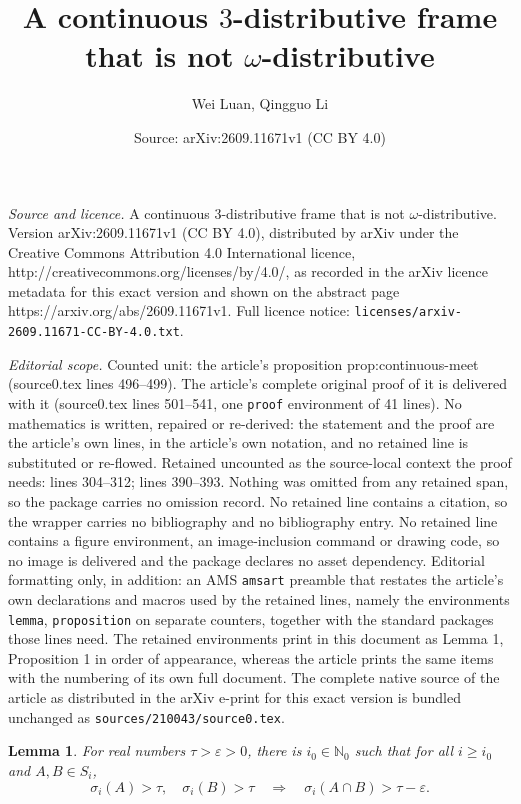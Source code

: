 \documentclass[10pt,a4paper]{amsart}
\title{A continuous $3$-distributive frame that is not $\omega$-distributive}
\author{Wei Luan, Qingguo Li}
\date{Source: arXiv:2609.11671v1 (CC BY 4.0)}
\newtheorem{lemma}{Lemma}
\newcommand{\NN}{\mathbb N}
\begin{document}
\maketitle

\noindent\emph{Source and licence.} A continuous $3$-distributive frame that is not $\omega$-distributive. Version arXiv:2609.11671v1 (CC BY 4.0), distributed by arXiv under the Creative Commons Attribution 4.0 International licence, http://creativecommons.org/licenses/by/4.0/, as recorded in the arXiv licence metadata for this exact version and shown on the abstract page https://arxiv.org/abs/2609.11671v1. Full licence notice: \texttt{licenses/arxiv-2609.11671-CC-BY-4.0.txt}.\par\smallskip

\noindent\textit{Editorial scope.} Counted unit: the article's proposition prop:continuous-meet (source0.tex lines 496--499). The article's complete original proof of it is delivered with it (source0.tex lines 501--541, one \texttt{proof} environment of 41 lines). No mathematics is written, repaired or re-derived: the statement and the proof are the article's own lines, in the article's own notation, and no retained line is substituted or re-flowed.  Retained uncounted as the source-local context the proof needs: lines 304--312; lines 390--393.  Nothing was omitted from any retained span, so the package carries no omission record.  No retained line contains a citation, so the wrapper carries no bibliography and no bibliography entry.  No retained line contains a figure environment, an image-inclusion command or drawing code, so no image is delivered and the package declares no asset dependency.  Editorial formatting only, in addition: an AMS \texttt{amsart} preamble that restates the article's own declarations and macros used by the retained lines, namely the environments \texttt{lemma}, \texttt{proposition} on separate counters, together with the standard packages those lines need.  The retained environments print in this document as Lemma 1, Proposition 1 in order of appearance, whereas the article prints the same items with the numbering of its own full document.  The complete native source of the article as distributed in the arXiv e-print for this exact version is bundled unchanged as \texttt{sources/210043/source0.tex}.
\begin{lemma}\label{lem:slow-intersection}
For real numbers $\tau>\varepsilon>0$, there is $i_0\in\NN_0$ such
that for all $i\geq i_0$ and $A,B\in S_i$,
\[
\sigma_i(A)>\tau,\quad\sigma_i(B)>\tau
\quad\Longrightarrow\quad
\sigma_i(A\cap B)>\tau-\varepsilon.
\]
\end{lemma}
\end{document}
